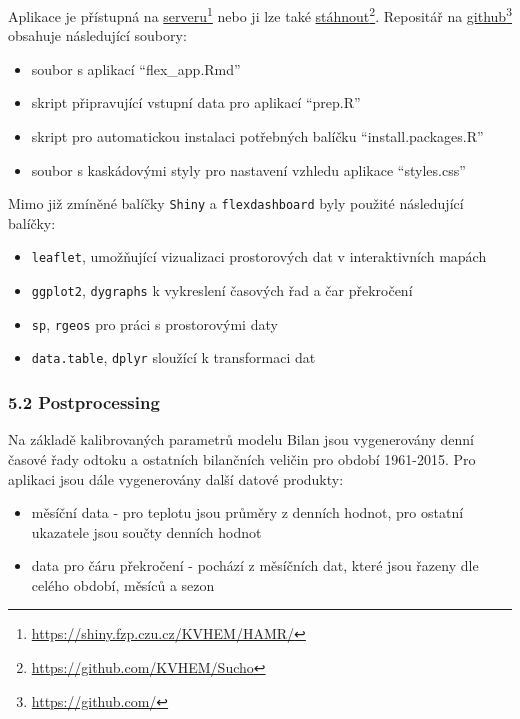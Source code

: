 \documentclass[12pt,]{article}
\providecommand{\tightlist}{%
  \setlength{\itemsep}{0pt}\setlength{\parskip}{0pt}}
\let\rmarkdownfootnote\footnote%
\def\footnote{\protect\rmarkdownfootnote}
\begin{document}
Aplikace je přístupná na
\href{https://shiny.fzp.czu.cz/KVHEM/HAMR/}{serveru}\footnote{\url{https://shiny.fzp.czu.cz/KVHEM/HAMR/}}
nebo ji lze také
\href{https://github.com/KVHEM/Sucho}{stáhnout}\footnote{\url{https://github.com/KVHEM/Sucho}}.
Repositář na \href{https://github.com/}{github}\footnote{\url{https://github.com/}}
obsahuje následující soubory:

\begin{itemize}
\tightlist
\item
  soubor s aplikací \enquote{flex\_app.Rmd}
\item
  skript připravující vstupní data pro aplikací \enquote{prep.R}
\item
  skript pro automatickou instalaci potřebných balíčku
  \enquote{install.packages.R}
\item
  soubor s kaskádovými styly pro nastavení vzhledu aplikace
  \enquote{styles.css}
\end{itemize}

Mimo již zmíněné balíčky \texttt{Shiny} a \texttt{flexdashboard} byly
použité následující balíčky:

\begin{itemize}
\tightlist
\item
  \texttt{leaflet}, umožňující vizualizaci prostorových dat v
  interaktivních mapách
\item
  \texttt{ggplot2}, \texttt{dygraphs} k vykreslení časových řad a čar
  překročení
\item
  \texttt{sp}, \texttt{rgeos} pro práci s prostorovými daty
\item
  \texttt{data.table}, \texttt{dplyr} sloužící k transformaci dat
\end{itemize}

\subsubsection{5.2 Postprocessing}\label{postprocessing}

Na základě kalibrovaných parametrů modelu Bilan jsou vygenerovány denní
časové řady odtoku a ostatních bilančních veličin pro období 1961-2015.
Pro aplikaci jsou dále vygenerovány další datové produkty:

\begin{itemize}
\tightlist
\item
  měsíční data - pro teplotu jsou průměry z denních hodnot, pro ostatní
  ukazatele jsou součty denních hodnot
\item
  data pro čáru překročení - pochází z měsíčních dat, které jsou řazeny
  dle celého období, měsíců a sezon
\end{itemize}
\end{document}
